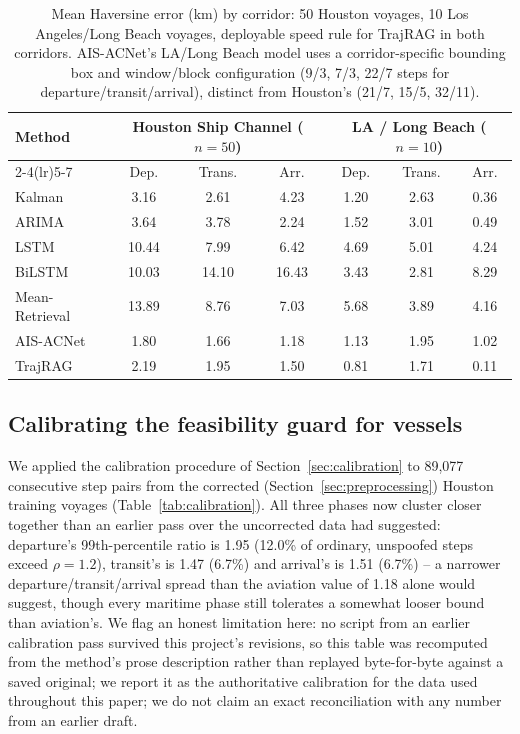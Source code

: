 \begin{table}[t]
\centering
\caption{Mean Haversine error (km) by corridor: 50 Houston voyages, 10 Los
Angeles/Long Beach voyages, deployable speed rule for TrajRAG in both
corridors. AIS-ACNet's LA/Long Beach model uses a corridor-specific
bounding box and window/block configuration (9/3, 7/3, 22/7 steps for
departure/transit/arrival), distinct from Houston's (21/7, 15/5, 32/11).}
\label{tab:corridor}
\footnotesize
\setlength{\tabcolsep}{3pt}
\begin{tabular}{lcccccc}
\toprule
\multirow{2}{*}{Method} & \multicolumn{3}{c}{Houston Ship Channel ($n=50$)} & \multicolumn{3}{c}{LA / Long Beach ($n=10$)} \\
\cmidrule(lr){2-4}\cmidrule(lr){5-7}
 & Dep. & Trans. & Arr. & Dep. & Trans. & Arr. \\
\midrule
Kalman & 3.16 & 2.61 & 4.23 & 1.20 & 2.63 & 0.36 \\
ARIMA & 3.64 & 3.78 & 2.24 & 1.52 & 3.01 & 0.49 \\
LSTM & 10.44 & 7.99 & 6.42 & 4.69 & 5.01 & 4.24 \\
BiLSTM & 10.03 & 14.10 & 16.43 & 3.43 & 2.81 & 8.29 \\
Mean-Retrieval & 13.89 & 8.76 & 7.03 & 5.68 & 3.89 & 4.16 \\
AIS-ACNet & 1.80 & 1.66 & 1.18 & 1.13 & 1.95 & 1.02 \\
TrajRAG & 2.19 & 1.95 & 1.50 & 0.81 & 1.71 & 0.11 \\
\bottomrule
\end{tabular}
\end{table}

\subsection{Calibrating the feasibility guard for vessels}
\label{sec:maritime-calibration}

We applied the calibration procedure of Section~\ref{sec:calibration} to
89,077 consecutive step pairs from the corrected (Section~\ref{sec:preprocessing})
Houston training voyages (Table~\ref{tab:calibration}). All three phases
now cluster closer together than an earlier pass over the uncorrected data
had suggested: departure's 99th-percentile ratio is 1.95 (12.0\% of
ordinary, unspoofed steps exceed $\rho=1.2$), transit's is 1.47 (6.7\%) and
arrival's is 1.51 (6.7\%) -- a narrower departure/transit/arrival spread
than the aviation value of 1.18 alone would suggest, though every maritime
phase still tolerates a somewhat looser bound than aviation's. We flag an
honest limitation here: no script from an earlier calibration pass survived
this project's revisions, so this table was recomputed from the method's
prose description rather than replayed byte-for-byte against a saved
original; we report it as the authoritative calibration for the data used
throughout this paper; we do not claim an exact reconciliation with any
number from an earlier draft.

